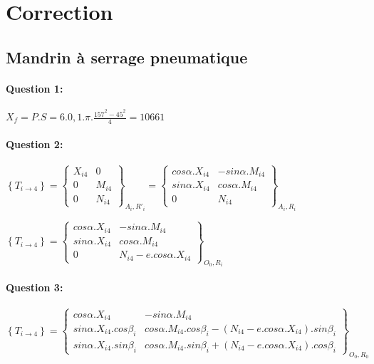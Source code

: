 \ifdef{\public}{}{}

\newpage

\section{Correction}

\subsection{Mandrin à serrage pneumatique}

\paragraph{Question 1:}

$X_f=P.S=6.0,1.\pi.\frac{157^2-45^2}{4}=10661$

\paragraph{Question 2:}

$\left\{T_{i\rightarrow 4}\right\}=\left\{\begin{array}{cc}
X_{i4} & 0 \\ 0 & M_{i4} \\  0 & N_{i4}
\end{array}\right\}_{A_i,R'_i}=\left\{\begin{array}{cc}
cos\alpha.X_{i4} & -sin\alpha.M_{i4} \\ sin\alpha.X_{i4} & cos\alpha.M_{i4} \\  0 & N_{i4}
\end{array}\right\}_{A_i,R_i}$

$\left\{T_{i\rightarrow 4}\right\}=\left\{\begin{array}{cc}
cos\alpha.X_{i4} & -sin\alpha.M_{i4} \\ sin\alpha.X_{i4} & cos\alpha.M_{i4} \\  0 & N_{i4}-e.cos\alpha.X_{i4}
\end{array}\right\}_{O_0,R_i}$

\paragraph{Question 3:}

$\left\{T_{i\rightarrow 4}\right\}=\left\{\begin{array}{cc}
cos\alpha.X_{i4} & -sin\alpha.M_{i4} \\ sin\alpha.X_{i4}.cos\beta_i & cos\alpha.M_{i4}.cos\beta_i-(N_{i4}-e.cos\alpha.X_{i4}).sin\beta_i \\ sin\alpha.X_{i4}.sin\beta_i & cos\alpha.M_{i4}.sin\beta_i+(N_{i4}-e.cos\alpha.X_{i4}).cos\beta_i
\end{array}\right\}_{O_0,R_0}$

